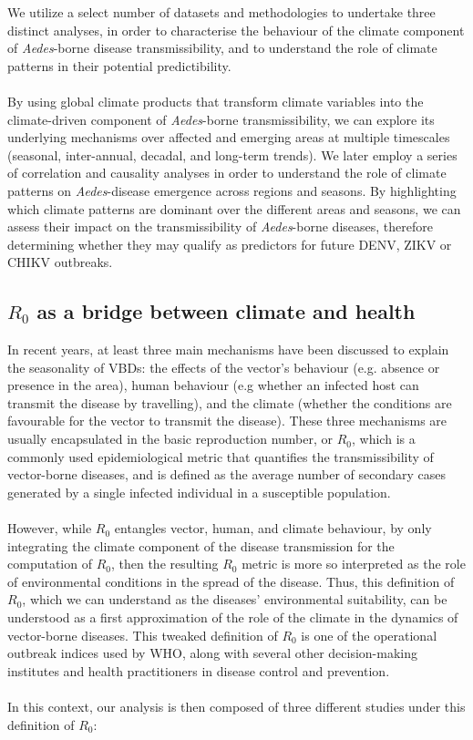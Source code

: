 \documentclass[10pt,twocolumn]{wlscirep}
\begin{document}
We utilize a select number of datasets and methodologies to undertake three distinct analyses, in order to characterise the behaviour of the climate component of \textit{Aedes}-borne disease transmissibility, and to understand the role of climate patterns in their potential predictibility.
\\
\\
By using global climate products that transform climate variables into the climate-driven component of \textit{Aedes}-borne transmissibility, we can explore its underlying mechanisms over affected and emerging areas at multiple timescales (seasonal, inter-annual, decadal, and long-term trends). We later employ a series of correlation and causality analyses in order to understand the role of climate patterns on \textit{Aedes}-disease emergence across regions and seasons. By highlighting which climate patterns are dominant over the different areas and seasons, we can assess their impact on the transmissibility of \textit{Aedes}-borne diseases, therefore determining whether they may qualify as predictors for future DENV, ZIKV or CHIKV outbreaks.

\subsection{$R_0$ as a bridge between climate and health} \label{sec-methods-redefining-R0}

In recent years, at least three main mechanisms have been discussed to explain the seasonality of VBDs\cite{moriyama_2020}: the effects of the vector's behaviour (e.g. absence or presence in the area), human behaviour (e.g whether an infected host can transmit the disease by travelling), and the climate (whether the conditions are favourable for the vector to transmit the disease). These three mechanisms are usually encapsulated in the basic reproduction number, or $R_0$, which is a commonly used epidemiological metric that quantifies the transmissibility of vector-borne diseases, and is defined as the average number of secondary cases generated by a single infected individual in a susceptible population\cite{dietz_1993}.
\\
\\
However, while $R_0$ entangles vector, human, and climate behaviour, by only integrating the climate component of the disease transmission for the computation of $R_0$, then the resulting $R_0$ metric is more so interpreted as the role of environmental conditions in the spread of the disease. Thus, this definition of $R_0$, which we can understand as the diseases' environmental suitability, can be understood as a first approximation of the role of the climate in the dynamics of vector-borne diseases. This tweaked definition of $R_0$ is one of the operational outbreak indices used by WHO, along with several other decision-making institutes and health practitioners in disease control and prevention\cite{OMS_2017, chiew_2014}.
\\
\\
In this context, our analysis is then composed of three different studies under this definition of $R_0$:
\end{document}
